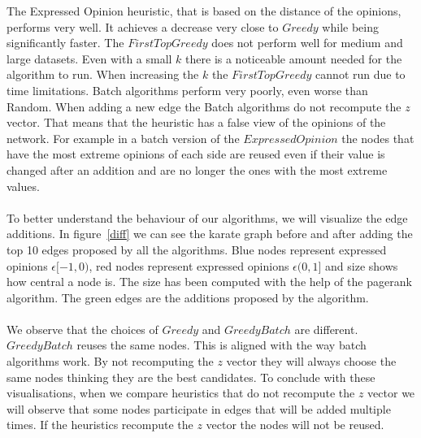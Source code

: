 \noindent The Expressed Opinion heuristic, that is based on the distance of the opinions, performs very well. It achieves a decrease very close to $Greedy$ while being significantly faster.
The $FirstTopGreedy$ does not perform well for medium and large datasets. Even with a small $k$ there is a noticeable amount needed for the algorithm to run. When increasing the $k$ the $FirstTopGreedy$ cannot run due to time limitations. 
Batch algorithms perform very poorly, even worse than Random. When adding a new edge the Batch algorithms do not recompute the $z$ vector. That means that the heuristic has a false view of the opinions of the network. For example in a batch version of the $ExpressedOpinion$ the nodes that have the most extreme opinions of each side are reused even if their value is changed after an addition and are no longer the ones with the most extreme values.
\\
\\
\noindent To better understand the behaviour of our algorithms, we will visualize the edge additions.
In figure~\ref{diff} we can see the karate graph before and after adding the top 10 edges proposed by all the algorithms. Blue nodes represent expressed opinions $\epsilon [-1,0)$, red nodes represent expressed opinions $\epsilon (0,1]$ and size shows how central a node is. The size has been computed with the help of the pagerank algorithm. The green edges are the additions proposed by the algorithm.
\\
\\
We observe that the choices of $Greedy$ and $GreedyBatch$ are different. $GreedyBatch$ reuses the same nodes. This is aligned with the way batch algorithms work. By not recomputing the $z$ vector they will always choose the same nodes thinking they are the best candidates. To conclude with these visualisations, when we compare heuristics that do not recompute the $z$ vector we will observe that some nodes participate in edges that will be added multiple times. If the heuristics recompute the $z$ vector the nodes will not be reused.
\clearpage


